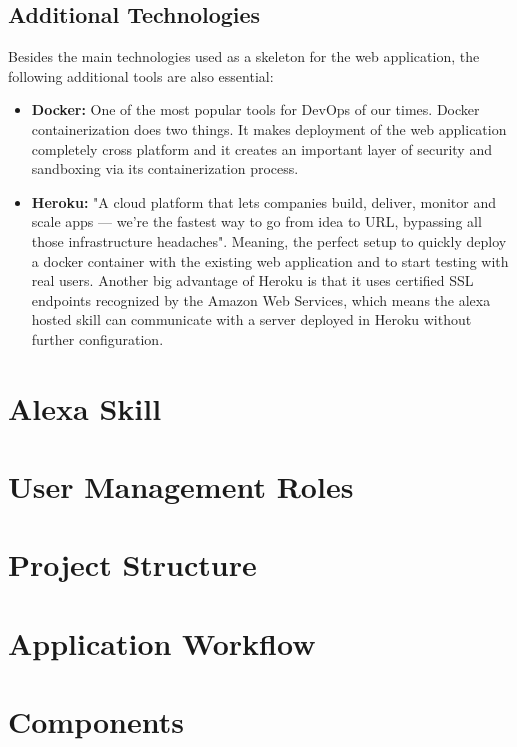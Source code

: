 \subsection{Additional Technologies}

Besides the main technologies used as a skeleton for the web application, 
the following additional tools are also essential:

\begin{itemize}
\item \textbf{Docker:} One of the most popular tools for DevOps of our times. Docker 
    containerization does two things. It makes deployment of the web application completely
    cross platform and it creates an important layer of security and sandboxing 
    via its containerization process.

\item \textbf{Heroku:} "A cloud platform that lets companies build, deliver, monitor and 
    scale apps — we're the fastest way to go from idea to URL, bypassing all those 
    infrastructure headaches". Meaning, the perfect setup to quickly deploy a docker
    container with the existing web application and to start testing with real users.
    Another big advantage of Heroku is that it uses certified SSL endpoints recognized
    by the Amazon Web Services, which means the alexa hosted skill can communicate 
    with a server deployed in Heroku without further configuration.

\end{itemize}

\section{Alexa Skill}



\section{User Management Roles}


\section{Project Structure}


\section{Application Workflow}


\section{Components}


